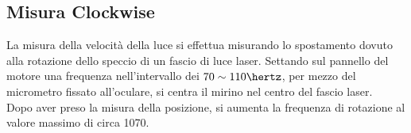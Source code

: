 \subsection{Misura Clockwise}
La misura della velocità della luce si effettua misurando lo spostamento dovuto alla rotazione dello speccio di un fascio di luce laser.
Settando sul pannello del motore una frequenza nell'intervallo dei $70\sim 110\hertz$, per mezzo del micrometro fissato all'oculare, si centra il mirino nel centro del fascio laser.\\
Dopo aver preso la misura della posizione, si aumenta la frequenza di rotazione al valore massimo di circa 1070\hertz.
